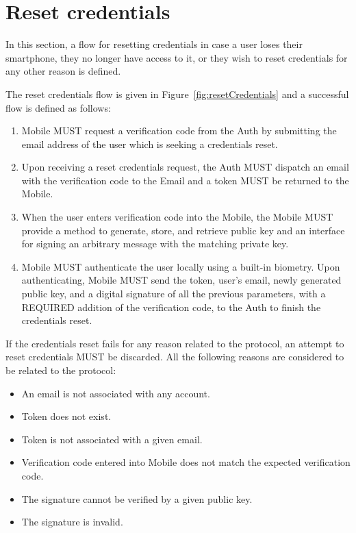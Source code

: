 \section{Reset credentials}
In this section, a flow for resetting credentials in case a user loses their smartphone, they no longer have access to it,
or they wish to reset credentials for any other reason is defined.
\medskip

The reset credentials flow is given in Figure~\ref{fig:resetCredentials} and a successful flow is defined as follows:
    \begin{enumerate}
        \item Mobile MUST request a verification code from the Auth by submitting the email address of the user
              which is seeking a credentials reset.
        \item Upon receiving a reset credentials request, the Auth MUST dispatch an email with the verification
              code to the Email and a token MUST be returned to the Mobile.
        \item When the user enters verification code into the Mobile, the Mobile MUST provide a method to generate,
              store, and retrieve public key and an interface for signing an arbitrary message with the matching 
              private key.
        \item Mobile MUST authenticate the user locally using a built-in biometry. Upon authenticating, Mobile 
              MUST send the token, user's email, newly generated public key, and a digital signature of all the 
              previous parameters, with a REQUIRED addition of the verification code, to the Auth to finish the 
              credentials reset.
    \end{enumerate}
    
If the credentials reset fails for any reason related to the protocol, an attempt to reset credentials MUST 
be discarded. All the following reasons are considered to be related to the protocol:
    \begin{itemize}
        \item An email is not associated with any account.
        \item Token does not exist.
        \item Token is not associated with a given email.
        \item Verification code entered into Mobile does not match the expected verification code.
        \item The signature cannot be verified by a given public key.
        \item The signature is invalid.
    \end{itemize}
